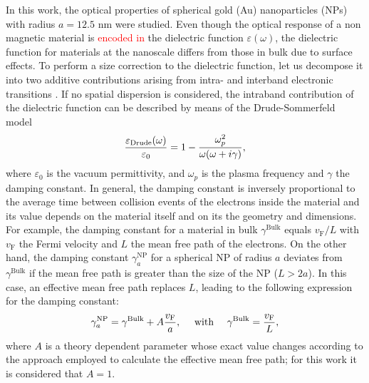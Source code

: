 
In this work, the optical properties of spherical gold (Au) nanoparticles (NPs) with radius $a = 12.5$ nm were studied. Even though the optical response of a non magnetic material is \textcolor{red}{encoded in} the dielectric function $\varepsilon(\omega)$, the dielectric function for materials at the nanoscale differs from those in bulk due to surface effects. To perform a size correction to the dielectric function, let us decompose it into two additive contributions arising from intra- and interband electronic transitions \cite{noguez_surface_2007}. If no spatial dispersion is considered, the intraband contribution of the dielectric function can be described by means of the Drude-Sommerfeld model
%
\begin{align}
\frac{\varepsilon_\text{\scriptsize Drude}(\omega)}{\varepsilon_0} = 1 - \frac{\omega_p^2}{\omega(\omega + i \gamma)},
\label{eq:Drude}
\end{align}
%
where $\varepsilon_0$ is the vacuum permittivity, and $\omega_p$ is the plasma frequency and $\gamma$ the damping constant. In general, the damping constant is inversely proportional to the average time between collision events of the electrons inside the material and its value depends on the material itself and on its the geometry and dimensions. For example, the damping constant for a material in bulk $\gamma^\text{Bulk}$ equals $v_\text{F}/L$  with $v_\text{F}$ the Fermi velocity and $L$ the  mean free path of the electrons. On the other hand, the damping constant $\gamma^\text{NP}_a$ for a spherical NP of radius $a$ deviates from $\gamma^\text{Bulk}$ if the mean free path is greater than the size of the NP ($ L > 2a $). In this case, an effective  mean free path replaces $L$, leading to the following expression for the damping constant:
%
\begin{align}
\gamma^\text{\scriptsize  NP}_a =  \gamma^\text{\scriptsize Bulk} + A\frac{v_\text{F}}{a},
\qqtext{ with }
\gamma^\text{\scriptsize  Bulk} = \frac{v_\text{F}}{L},
\label{eq:SC}
\end{align}
%
where $A$ is a theory dependent parameter whose exact value changes according to the approach employed to calculate the effective mean free path; for this work it is considered that $A = 1$.

